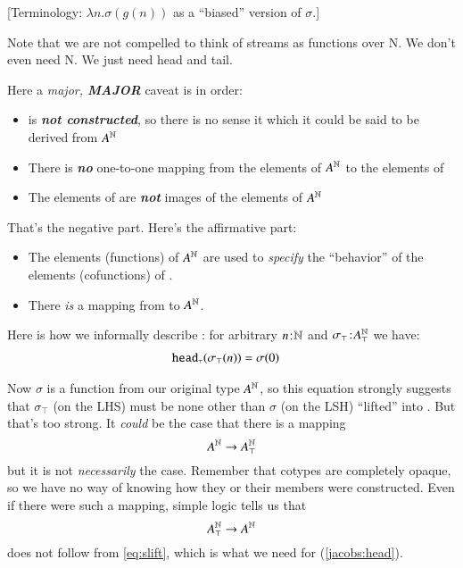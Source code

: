 [Terminology: \(\lambda{}n.\sigma(g(n))\) as a ``biased'' version of
  \(\sigma\).]

\vspace{3ex}

Note that we are not compelled to think of streams as functions over
N. We don't even need N. We just need head and tail.

Here a \textit{major, \textbf{MAJOR}} caveat is in order:

\begin{itemize}
\item {} is \textit{\textbf{not constructed}}, so
  there is no sense it which it could be said to be derived from
  \(A^{\mathbb{N}}\)
\item There is \textit{\textbf{no}} one-to-one mapping from the elements of \(A^{\mathbb{N}}\) to the elements of 
\item The elements of  are \textit{\textbf{not}}
  images of the elements of \(A^{\mathbb{N}}\)
\end{itemize}

That's the negative part.  Here's the affirmative part:

\begin{itemize}
\item The elements (functions) of \(A^{\mathbb{N}}\) are used to
  \textit{specify} the ``behavior'' of the elements (cofunctions) of
  .
\item There \textit{is} a mapping from  to \(A^{\mathbb{N}}\).
\end{itemize}

Here is how we informally describe : for arbitrary
\(n\hspace{1pt}\mathpunct{:}\hspace{-1pt}\mathbb{N}\) and \(\sigma_{\top}\hspace{1pt}\mathpunct{:}\hspace{-1pt}A_{\top}^{\mathbb{N}}\) we have:
\begin{align}
  \texttt{\upshape head}_{\scriptscriptstyle\top}(\sigma_{\top}(n)) & = \sigma(0) \label{jacobs:head}
\end{align}

Now \(\sigma\) is a function from our original type \(A^{\mathbb{N}}\), so
this equation strongly suggests that \(\sigma_{\top}\) (on the LHS)
must be none other than \(\sigma\) (on the LSH) ``lifted'' into
. But that's too strong. It \textit{could} be the
case that there is a mapping
\begin{equation}
  A^{\mathbb{N}}\rightarrow A_{\top}^{\mathbb{N}}\label{eq:slift}
\end{equation}
\noindent
but it is not \textit{necessarily} the case. Remember that cotypes are
completely opaque, so we have no way of knowing how they or their
members were constructed. Even if there were such a mapping, simple
logic tells us that
\begin{equation}
  A_{\top}^{\mathbb{N}}\rightarrow A^{\mathbb{N}}
\end{equation}
\noindent
does not follow from \ref{eq:slift}, which is what we need for (\ref{jacobs:head}).

